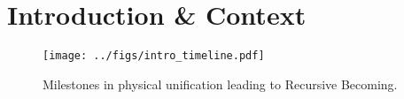 \section{Introduction \& Context}
\label{sec:intro}

\begin{figure}[h]
  \centering
  \texttt{[image: ../figs/intro\_timeline.pdf]}
  \caption{Milestones in physical unification leading to Recursive Becoming.}
  \label{fig:intro-timeline}
\end{figure}
\clearpage 